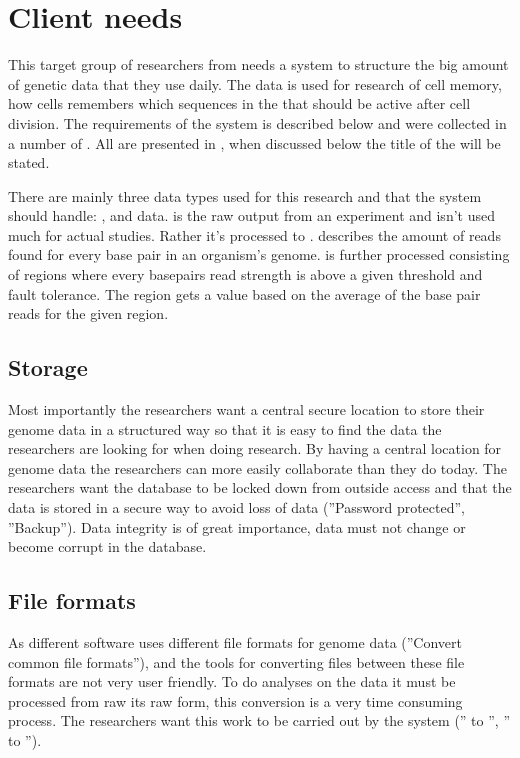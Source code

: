 \section{Client needs}
This target group of researchers from  needs a system to structure the big amount of genetic data that they use daily. The data is used for research of cell memory, how cells remembers which sequences in the  that should be active after cell division. The requirements of the system is described below and were collected in a number of . All  are presented in , when discussed below the title of the  will be stated.

There are mainly three data types used for this research and that the system should handle: ,  and  data.  is the raw output from an experiment and isn't used much for actual studies. Rather it's processed to .  describes the amount of reads found for every base pair in an organism's genome.  is further processed  consisting of regions where every basepairs read strength is above a given threshold and fault tolerance. The region gets a value based on the average of the base pair reads for the given region.

\subsection{Storage}
Most importantly the researchers want a central secure location to store their genome data in a structured  way so that it is easy to find the data the researchers are looking for when doing research. By having a central location for genome data the researchers can more easily collaborate than they do today. The researchers want the database to be locked down from outside access and that the data is stored in a secure way to avoid loss of data (''Password protected'', ''Backup''). Data integrity is of great importance, data must not change or become corrupt in the database.

\subsection{File formats}
As different software uses different file formats for genome data (''Convert common file formats''), and the tools for converting files between these file formats are not very user friendly. To do analyses on the data it must be processed from raw its raw form, this conversion is a very time consuming process. The researchers want this work to be carried out by the system ('' to '', '' to '').

